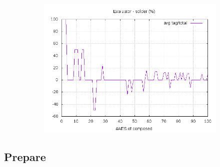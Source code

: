 \documentclass[10pt,a4paper]{article}
\begin{document}
\begin{figure}[h]
\begin{subfigure}[t]{0.3\textwidth}
        \includegraphics[width=\textwidth]{eval_solder_frac}
        \caption{}
    \end{subfigure}
\end{figure}

\subsection{Prepare}
\end{document}

